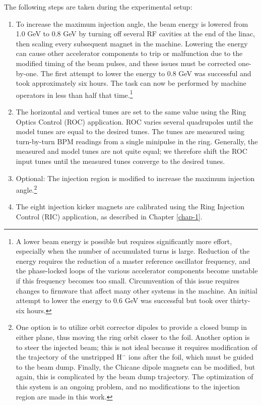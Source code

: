 The following steps are taken during the experimental setup:
%
\begin{enumerate}
    \item 
    To increase the maximum injection angle, the beam energy is lowered from 1.0 GeV to 0.8 GeV by turning off several RF cavities at the end of the linac, then scaling every subsequent magnet in the machine. Lowering the energy can cause other accelerator components to trip or malfunction due to the modified timing of the beam pulses, and these issues must be corrected one-by-one. The first attempt to lower the energy to 0.8 GeV was successful and took approximately six hours. The task can now be performed by machine operators in less than half that time.\footnote{A lower beam energy is possible but requires significantly more effort, especially when the number of accumulated turns is large. Reduction of the energy requires the reduction of a master reference oscillator frequency, and the phase-locked loops of the various accelerator components become unstable if this frequency becomes too small. Circumvention of this issue requires changes to firmware that affect many other systems in the machine. An initial attempt to lower the energy to 0.6 GeV was successful but took over thirty-six hours.}
    \item
    The horizontal and vertical tunes are set to the same value using the Ring Optics Control (ROC) application. ROC varies several quadrupoles until the model tunes are equal to the desired tunes. The tunes are measured using turn-by-turn BPM readings from a single minipulse in the ring. Generally, the measured and model tunes are not quite equal; we therefore shift the ROC input tunes until the measured tunes converge to the desired tunes. 
    \item
    Optional: The injection region is modified to increase the maximum injection angle.\footnote{One option is to utilize orbit corrector dipoles to provide a closed bump in either plane, thus moving the ring orbit closer to the foil. Another option is to steer the injected beam; this is not ideal because it requires modification of the trajectory of the unstripped H$^-$ ions after the foil, which must be guided to the beam dump. Finally, the Chicane dipole magnets can be modified, but again, this is complicated by the beam dump trajectory. The optimization of this system is an ongoing problem, and no modifications to the injection region are made in this work.}
    \item
    The eight injection kicker magnets are calibrated using the Ring Injection Control (RIC) application, as described in Chapter \ref{chap-1}. 

\end{enumerate}
